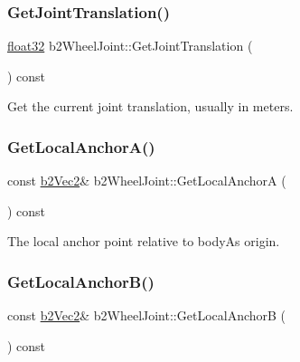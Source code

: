 \mbox{\label{classb2_wheel_joint_a4cebb70f659344d5d93c1885d47000e3}} 
\subsubsection{\texorpdfstring{GetJointTranslation()}{GetJointTranslation()}}
{\footnotesize\ttfamily \mbox{\hyperlink{b2_settings_8h_aacdc525d6f7bddb3ae95d5c311bd06a1}{float32}} b2\+Wheel\+Joint\+::\+Get\+Joint\+Translation (\begin{DoxyParamCaption}{ }\end{DoxyParamCaption}) const}



Get the current joint translation, usually in meters. 

\mbox{\label{classb2_wheel_joint_aaf132c39227962a0b0788558e7dd6662}} 
\subsubsection{\texorpdfstring{GetLocalAnchorA()}{GetLocalAnchorA()}}
{\footnotesize\ttfamily const \mbox{\hyperlink{structb2_vec2}{b2\+Vec2}}\& b2\+Wheel\+Joint\+::\+Get\+Local\+AnchorA (\begin{DoxyParamCaption}{ }\end{DoxyParamCaption}) const\hspace{0.3cm}{\ttfamily [inline]}}



The local anchor point relative to bodyA\textquotesingle{}s origin. 

\mbox{\label{classb2_wheel_joint_a78c56833f42bfc61998aa5ea8c876f3e}} 
\subsubsection{\texorpdfstring{GetLocalAnchorB()}{GetLocalAnchorB()}}
{\footnotesize\ttfamily const \mbox{\hyperlink{structb2_vec2}{b2\+Vec2}}\& b2\+Wheel\+Joint\+::\+Get\+Local\+AnchorB (\begin{DoxyParamCaption}{ }\end{DoxyParamCaption}) const\hspace{0.3cm}{\ttfamily [inline]}}



